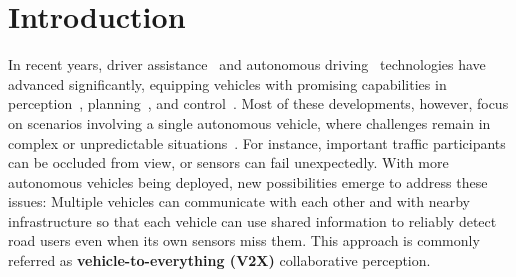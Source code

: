 

\section{Introduction}
\label{sec:intro}

 



In recent years, driver assistance~\citep{khan2019comprehensive,nidamanuri2021progressive} and autonomous driving~\citep{yurtsever2020survey,nhtsa_report} technologies have advanced significantly, equipping vehicles with promising capabilities in perception~\citep{lang2019pointpillars,yin2021center}, planning~\citep{hu2022st,hu2023planning}, and control~\citep{amini2020learning,di2021survey}. Most of these developments, however, focus on scenarios involving a single autonomous vehicle, where challenges remain in complex or unpredictable situations~\citep{xu2022opv2v}. For instance, important traffic participants can be occluded from view, or sensors can fail unexpectedly. With more autonomous vehicles being deployed, new possibilities emerge to address these issues: Multiple vehicles can communicate with each other and with nearby infrastructure so that each vehicle can use shared information to reliably detect road users even when its own sensors miss them. This approach is commonly referred as \textbf{vehicle-to-everything (V2X)} collaborative perception.

